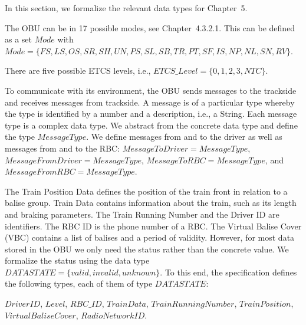 \documentclass{template/openetcs_article}
\begin{document}
In this section, we formalize the relevant data types for Chapter~5. 

The OBU can be in 17 possible modes, see Chapter~4.3.2.1. This can be defined as a set $\mathit{Mode}$ with $\mathit{Mode} = \{\mathit{FS, LS, OS, SR, SH, UN, PS, SL, SB, TR, PT, SF, IS, NP, NL, SN, RV}\}$.

There are five possible ETCS levels, i.e., $\mathit{ETCS\_Level} = \{0, 1, 2, 3, \mathit{NTC}\}$.

To communicate with its environment, the OBU sends messages to the trackside and receives messages from trackside. A message is of a particular type whereby the type is identified by a number and a description, i.e., a String. Each message type is a complex data type. We abstract from the concrete data type and define the type $\mathit{MessageType}$. We define messages from and to the driver as well as messages from and to the RBC: $\mathit{MessageToDriver} = \mathit{MessageType}$, $\mathit{MessageFromDriver} = \mathit{MessageType}$, $\mathit{MessageToRBC} = \mathit{MessageType}$, and $\mathit{MessageFromRBC} = \mathit{MessageType}$.

The Train Position Data defines the position of the train front in relation to a balise group. Train Data contains information about the train, such as its length and braking parameters. The Train Running Number and the Driver ID are identifiers. The RBC ID is the phone number of a RBC. The Virtual Balise Cover (VBC) contains a list of balises and a period of validity. However, for most data stored in the OBU we only need the status rather than the concrete value. We formalize the status using the data type $\mathit{DATASTATE} = \{\mathit{valid}, \mathit{invalid}, \mathit{unknown}\}$. To this end, the specification defines the following types, each of them of type $\mathit{DATASTATE}$:

$\mathit{DriverID}$, $\mathit{Level}$, $\mathit{RBC\_ID}$, $\mathit{TrainData}$, $\mathit{TrainRunningNumber}$, $\mathit{TrainPosition}$, $\mathit{VirtualBaliseCover}$, $\mathit{RadioNetworkID}$.

\end{document}
